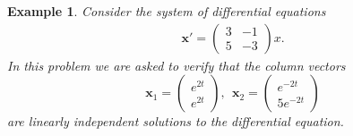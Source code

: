 \documentclass[11pt]{amsart}
\newtheorem{example}{Example}
\numberwithin{equation}{section}
\begin{document}
\begin{example}
Consider the system of differential equations
\begin{align*}
\mathbf{x}' = \left( 
\begin{matrix}
3 & -1 \\
5 & -3
\end{matrix}
\right) x. 
\end{align*}
In this problem we are asked to verify that the column vectors 
\begin{equation*}
\mathbf{x}_1=\left(
\begin{matrix}
e^{2t}\\
e^{2t}
\end{matrix}
\right), \ \ \mathbf{x}_2=\left(
\begin{matrix}
e^{-2t}\\
5e^{-2t}
\end{matrix}
\right)
\end{equation*}
are linearly independent solutions to the differential equation. 


\end{example}
\end{document}
